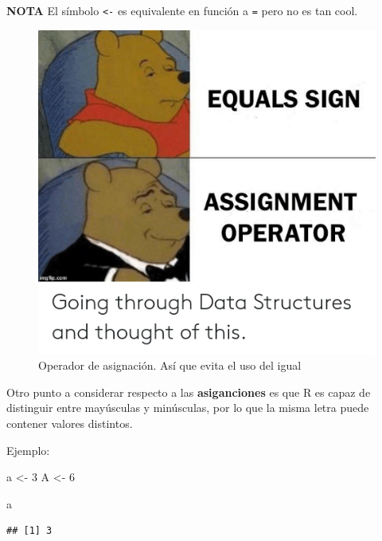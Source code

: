 \documentclass[
]{book}
\newenvironment{Shaded}{\begin{snugshade}}{\end{snugshade}}
\newcommand{\DecValTok}[1]{\textcolor[rgb]{0.00,0.00,0.81}{#1}}
\newcommand{\NormalTok}[1]{#1}
\newcommand{\OtherTok}[1]{\textcolor[rgb]{0.56,0.35,0.01}{#1}}
\begin{document}
\textbf{NOTA} El símbolo \texttt{\textless{}-} es equivalente en función a \texttt{=} pero no es tan cool.

\begin{figure}
\centering
\includegraphics{equals-sign-assignment-operator-imgflip-com-going-through-data-structures-and-47188178.png}
\caption{Operador de asignación. Así que evita el uso del igual}
\end{figure}

Otro punto a considerar respecto a las \textbf{asiganciones} es que R es capaz de distinguir entre mayúsculas y minúsculas, por lo que la misma letra puede contener valores distintos.

Ejemplo:

\begin{Shaded}
\begin{Highlighting}[]
\NormalTok{a }\OtherTok{\textless{}{-}} \DecValTok{3}
\NormalTok{A }\OtherTok{\textless{}{-}} \DecValTok{6}
\end{Highlighting}
\end{Shaded}

\begin{Shaded}
\begin{Highlighting}[]
\NormalTok{a}
\end{Highlighting}
\end{Shaded}

\begin{verbatim}
## [1] 3
\end{verbatim}
\end{document}
